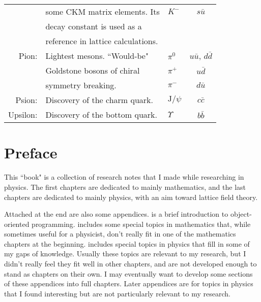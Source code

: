 \documentclass[12pt]{book}
\theoremstyle{definition}
\newenvironment{frontstuff}
  {\centering\chapter*{}}
  {\clearpage}
\begin{document}
\begin{frontstuff}
\begin{tabularx}{\linewidth}{rLlc}
         & some CKM matrix elements. Its 
                                     & $K^-$ &   $s\bar{u}$ \\
         & decay constant is used as a 
                                     &       &              \\
         & reference in lattice calculations.
                                     &       &              
\vspace{2mm}\\
Pion:    & Lightest mesons. ``Would-be"
                                     & $\pi^0$ &   $u\bar{u}$,
                                                   $d\bar{d}$ \\
         & Goldstone bosons of chiral& $\pi^+$ &   $u\bar{d}$ \\
         & symmetry breaking.        & $\pi^-$ &   $d\bar{u}$
\vspace{2mm}\\
Psion:   & Discovery of the charm quark.
         & $\text{J}/\psi$                     &   $c\bar{c}$ 
\vspace{2mm}\\
Upsilon: & Discovery of the bottom quark.
         & $\Upsilon$                          &   $b\bar{b}$ \\
\end{tabularx}
\clearpage

\end{frontstuff} %

\chapter{Preface}
This ``book" is a collection of research notes that I made while researching in
physics. The first chapters are dedicated to mainly mathematics, and the last
chapters are dedicated to mainly physics, with an aim toward lattice field
theory. 

Attached at the end are also some appendices. 
 is a brief introduction to object-oriented programming.
 includes some special topics in mathematics 
that, while sometimes useful for a physicist, don't really fit in one of 
the mathematics chapters at the beginning.  includes
special topics in physics that fill in some of my gaps of knowledge. Usually
these topics are relevant to my research, but I didn't really feel they fit
well in other chapters, and are not developed enough to stand as chapters
on their own. I may eventually want
to develop some sections of these appendices into full chapters.
Later appendices are for topics in physics that I found interesting but are
not particularly relevant to my research.
\end{document}
